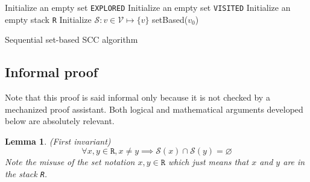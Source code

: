 \documentclass[a4 paper, 12pt]{article}
\def\GG{\ensuremath{\mathcal{G}}}
\def\VV{\ensuremath{\mathcal{V}}}
\def\EE{\ensuremath{\mathcal{E}}}
\newtheorem{lemma}{Lemma}
\begin{document}
\noindent
\begin{algorithm}[H]\label{alg:seqsetbased}
    \SetAlgoLined
    \KwData{\GG = (\VV, \EE), $v_0$\;}
    Initialize an empty set \texttt{EXPLORED}\;
    Initialize an empty set \texttt{VISITED}\;
    Initialize an empty stack \texttt{R}\;
    Initialize $\mathcal{S} \colon v \in \VV \mapsto \{v\}$\;
    setBased($v_0$)\;
    
    \caption{Sequential set-based SCC algorithm}
\end{algorithm}


\subsection{Informal proof}
Note that this proof is said informal only because it is not checked by a mechanized proof assistant. Both logical and mathematical arguments developed below are absolutely relevant.

\begin{lemma}(First invariant)\label{lemma:disjointness}
    \begin{equation*}
        \forall x, y \in \texttt{R}, x\neq y \implies \mathcal{S}(x) \cap \mathcal{S}(y) = \varnothing
    \end{equation*}
    Note the misuse of the set notation $x, y \in \texttt{R}$ which just means that $x$ and $y$ are in the stack \texttt{R}.
\end{lemma}
\end{document}
